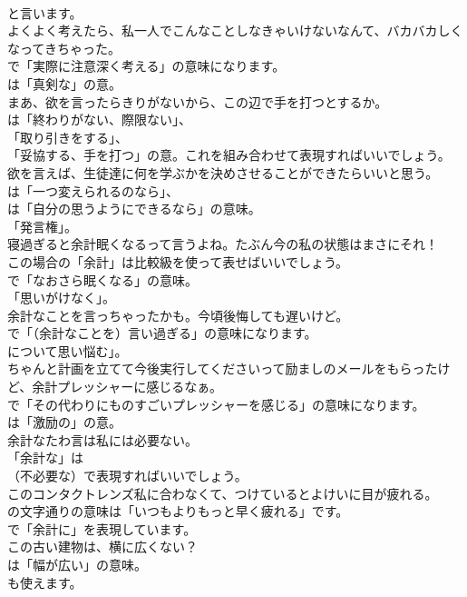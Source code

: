 \documentclass[8pt]{extreport}
\begin{document}
\begin{CJK}{UTF8}{min}
\\	と言います。	
\\	よくよく考えたら、私一人でこんなことしなきゃいけないなんて、バカバカしくなってきちゃった。 
\\	で「実際に注意深く考える」の意味になります。
\\	は「真剣な」の意。	
\\	まあ、欲を言ったらきりがないから、この辺で手を打つとするか。 
\\	は「終わりがない、際限ない」、
\\	「取り引きをする」、
\\	「妥協する、手を打つ」の意。これを組み合わせて表現すればいいでしょう。	
\\	欲を言えば、生徒達に何を学ぶかを決めさせることができたらいいと思う。 
\\	は「一つ変えられるのなら」、
\\	は「自分の思うようにできるなら」の意味。
\\	「発言権」。	
\\	寝過ぎると余計眠くなるって言うよね。たぶん今の私の状態はまさにそれ！ 
\\	この場合の「余計」は比較級を使って表せばいいでしょう。
\\	で「なおさら眠くなる」の意味。
\\	「思いがけなく」。	
\\	余計なことを言っちゃったかも。今頃後悔しても遅いけど。 
\\	で「（余計なことを）言い過ぎる」の意味になります。
\\	について思い悩む」。	
\\	ちゃんと計画を立てて今後実行してくださいって励ましのメールをもらったけど、余計プレッシャーに感じるなぁ。 
\\	で「その代わりにものすごいプレッシャーを感じる」の意味になります。
\\	は「激励の」の意。	
\\	余計なたわ言は私には必要ない。 
\\	「余計な」は 
\\	（不必要な）で表現すればいいでしょう。	
\\	このコンタクトレンズ私に合わなくて、つけているとよけいに目が疲れる。 
\\	の文字通りの意味は「いつもよりもっと早く疲れる」です。
\\	で「余計に」を表現しています。	
\\	この古い建物は、横に広くない？ 
\\	は「幅が広い」の意味。
\\	も使えます。	

\end{CJK}
\end{document}
